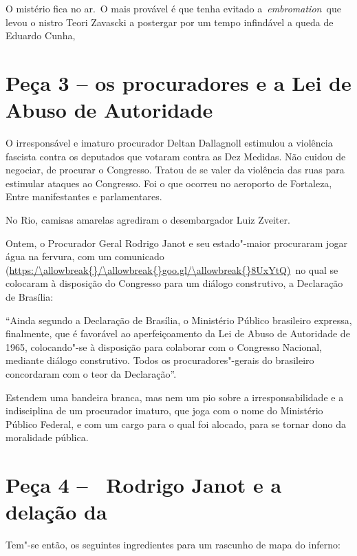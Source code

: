 O mistério fica no ar.~O mais provável é que tenha evitado
a~\emph{embromation~}que levou o nistro Teori Zavascki a postergar por
um tempo infindável a queda de Eduardo Cunha,~~

\section{Peça 3 -- os procuradores e a Lei de Abuso de Autoridade}

O irresponsável e imaturo procurador Deltan Dallagnoll estimulou a
violência fascista contra os deputados que votaram contra as Dez
Medidas. Não cuidou de negociar, de procurar o Congresso. Tratou de se
valer da violência das ruas para estimular ataques ao Congresso. Foi o
que ocorreu no aeroporto de Fortaleza, Entre manifestantes e
parlamentares.

 

No Rio, camisas amarelas agrediram o desembargador Luiz Zveiter.

Ontem, o Procurador Geral Rodrigo Janot e seu estado"-maior procuraram
jogar água na fervura, com um comunicado
(\url{https:/\allowbreak{}/\allowbreak{}goo.gl/\allowbreak{}8UxYtQ)}~no qual se colocaram à disposição do
Congresso para um diálogo construtivo, a Declaração de Brasília:

``Ainda segundo a Declaração de Brasília, o Ministério Público
brasileiro expressa, finalmente, que é favorável ao aperfeiçoamento da
Lei de Abuso de Autoridade de 1965, colocando"-se à disposição para
colaborar com o Congresso Nacional, mediante diálogo construtivo. Todos
os procuradores"-gerais do  brasileiro concordaram com o teor da
Declaração''.

Estendem uma bandeira branca, mas nem um pio sobre a irresponsabilidade
e a indisciplina de um procurador imaturo, que joga com o nome do
Ministério Público Federal, e com um cargo para o qual foi alocado, para
se tornar dono da moralidade pública.

\section{Peça 4 -- ~Rodrigo Janot e a delação da }

Tem"-se então, os seguintes ingredientes para um rascunho de mapa do
inferno:

